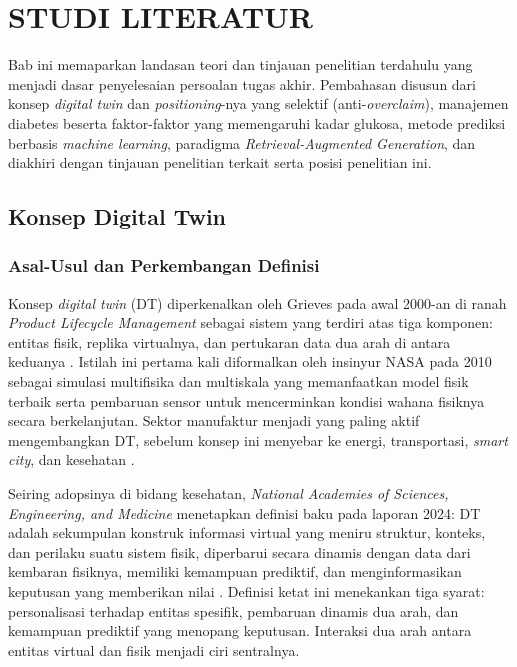 \cleardoublepage
\chapter{STUDI LITERATUR}
\label{chap:studi-literatur}

Bab ini memaparkan landasan teori dan tinjauan penelitian terdahulu yang menjadi dasar penyelesaian persoalan tugas akhir. Pembahasan disusun dari konsep \emph{digital twin} dan \emph{positioning}-nya yang selektif (anti-\emph{overclaim}), manajemen diabetes beserta faktor-faktor yang memengaruhi kadar glukosa, metode prediksi berbasis \emph{machine learning}, paradigma \emph{Retrieval-Augmented Generation}, dan diakhiri dengan tinjauan penelitian terkait serta posisi penelitian ini.

\section{Konsep Digital Twin}

\subsection{Asal-Usul dan Perkembangan Definisi}
Konsep \emph{digital twin} (DT) diperkenalkan oleh Grieves pada awal 2000-an di ranah \emph{Product Lifecycle Management} sebagai sistem yang terdiri atas tiga komponen: entitas fisik, replika virtualnya, dan pertukaran data dua arah di antara keduanya \autocite{grieves2017}. Istilah ini pertama kali diformalkan oleh insinyur NASA pada 2010 sebagai simulasi multifisika dan multiskala yang memanfaatkan model fisik terbaik serta pembaruan sensor untuk mencerminkan kondisi wahana fisiknya secara berkelanjutan. Sektor manufaktur menjadi yang paling aktif mengembangkan DT, sebelum konsep ini menyebar ke energi, transportasi, \emph{smart city}, dan kesehatan \autocite{drummond2024}.

Seiring adopsinya di bidang kesehatan, \emph{National Academies of Sciences, Engineering, and Medicine} menetapkan definisi baku pada laporan 2024: DT adalah sekumpulan konstruk informasi virtual yang meniru struktur, konteks, dan perilaku suatu sistem fisik, diperbarui secara dinamis dengan data dari kembaran fisiknya, memiliki kemampuan prediktif, dan menginformasikan keputusan yang memberikan nilai \autocite{nasem2024}. Definisi ketat ini menekankan tiga syarat: personalisasi terhadap entitas spesifik, pembaruan dinamis dua arah, dan kemampuan prediktif yang menopang keputusan. Interaksi dua arah antara entitas virtual dan fisik menjadi ciri sentralnya.

